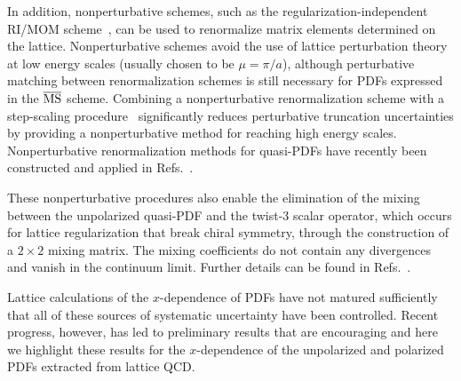 \begin{itemize}
In addition, nonperturbative schemes, such as the regularization-independent RI/MOM scheme~\cite{Martinelli:1994ty}, can be used to renormalize matrix elements determined on the lattice. Nonperturbative schemes avoid the use of lattice perturbation theory at low energy scales (usually chosen to be $\mu = \pi/a$), although perturbative matching between renormalization schemes is still necessary for PDFs expressed in the $\overline{\rm MS}$ scheme. Combining a nonperturbative renormalization scheme with a step-scaling procedure~\cite{Luscher:1991wu} significantly reduces perturbative truncation uncertainties by providing a nonperturbative method for reaching high energy scales. 
Nonperturbative renormalization methods for quasi-PDFs have recently been constructed and applied in Refs.~\cite{Alexandrou:2017huk,Chen:2017mzz}.

These nonperturbative procedures also enable the elimination of the mixing between the unpolarized quasi-PDF and the 
twist-3 scalar operator, which occurs for lattice regularization that break chiral symmetry, through the construction of a $2\times2$ mixing matrix. The mixing coefficients 
do not contain any divergences and vanish in the continuum limit. Further details can be found in
Refs.~\cite{Alexandrou:2017huk,Chen:2017mzz}. 
\end{itemize}


Lattice calculations of the $x$-dependence of PDFs have not matured sufficiently that all of these sources of systematic uncertainty have been controlled. Recent progress, however, has led to preliminary results that are encouraging and here we highlight these results for the $x$-dependence
of the unpolarized and polarized PDFs extracted from lattice QCD. 


